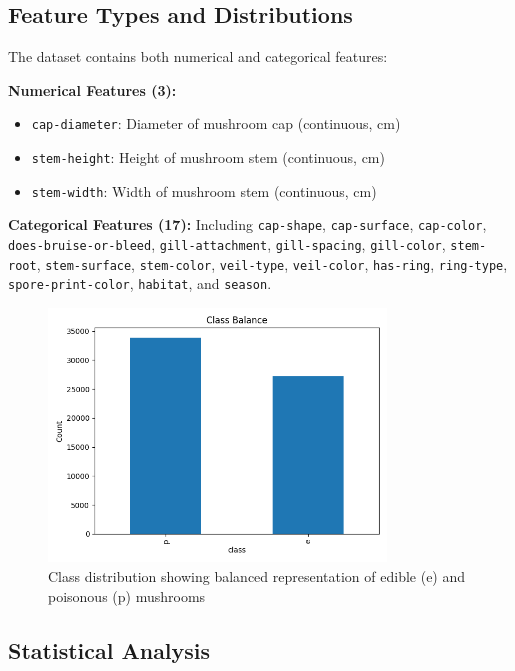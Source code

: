 \documentclass[11pt,a4paper]{article}
\begin{document}
\subsection{Feature Types and Distributions}

The dataset contains both numerical and categorical features:

\textbf{Numerical Features (3):}
\begin{itemize}
    \item \texttt{cap-diameter}: Diameter of mushroom cap (continuous, cm)
    \item \texttt{stem-height}: Height of mushroom stem (continuous, cm)  
    \item \texttt{stem-width}: Width of mushroom stem (continuous, cm)
\end{itemize}

\textbf{Categorical Features (17):}
Including \texttt{cap-shape}, \texttt{cap-surface}, \texttt{cap-color}, \texttt{does-bruise-or-bleed}, \texttt{gill-attachment}, \texttt{gill-spacing}, \texttt{gill-color}, \texttt{stem-root}, \texttt{stem-surface}, \texttt{stem-color}, \texttt{veil-type}, \texttt{veil-color}, \texttt{has-ring}, \texttt{ring-type}, \texttt{spore-print-color}, \texttt{habitat}, and \texttt{season}.

\begin{figure}[H]
    \centering
    \includegraphics[width=0.8\textwidth]{figures/eda_class_balance.png}
    \caption{Class distribution showing balanced representation of edible (e) and poisonous (p) mushrooms}
    \label{fig:class_balance}
\end{figure}

\subsection{Statistical Analysis}
\end{document}
